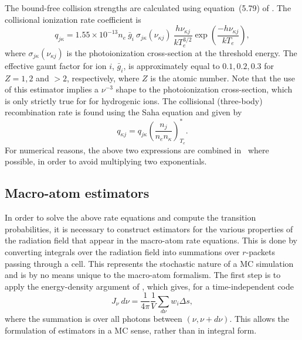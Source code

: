 The bound-free collision strengths are calculated using equation~(5.79) of
\cite{mihalas}. The collisional ionization rate coefficient is
\begin{equation}
q_{j\kappa} = 1.55 \times 10^{-13} n_e~\bar{g}_{i}~\sigma_{j\kappa} (\nu_{\kappa j})~
\frac{h \nu_{\kappa j}}{k T_e^{3/2}}
\exp \left( \frac{- h \nu_{\kappa j}}{k T_e} \right),
\label{eq:qioniz}
\end{equation}
where $\sigma_{j\kappa} (\nu_{\kappa j})$ is the photoionization cross-section 
at the threshold energy.
The effective gaunt factor for ion $i$, $\bar{g}_{i}$, is approximately
equal to $0.1,0.2,0.3$ for $Z=1,2$ and $>2$, respectively,
where $Z$ is the atomic number. Note that the use of this estimator
implies a $\nu^{-3}$ shape to the photoionization cross-section,
which is only strictly true for for hydrogenic ions.
The collisional (three-body) recombination rate is found using the Saha equation
and given by
\begin{equation}
q_{\kappa j} = q_{j\kappa} \left( \frac{n_j}{n_e n_\kappa} \right)^*_{T_e}.
\label{eq:qrecomb}
\end{equation}
For numerical reasons, the above two expressions are combined in \py\ where 
possible, in order to avoid multiplying two exponentials.





\subsection{Macro-atom estimators}
\label{sec:estimators}
In order to solve the above rate equations and compute the transition 
probabilities, it is necessary to construct estimators for the various properties
of the radiation field that appear in the macro-atom rate equations. This is done
by converting integrals over the radiation field into summations over 
$r$-packets passing through a cell. This represents the stochastic nature of
a MC simulation and is by no means unique to the macro-atom formalism.
The first step is to apply the energy-density argument of \cite{lucy1999radeq},
which gives, for a time-independent code
\begin{equation}
J_\nu~d\nu = \frac{1}{4\pi}\frac{1}{V} \sum_{d\nu} w_i \Delta s,
\end{equation}
where the summation is over all photons between $(\nu, \nu+d\nu)$. This allows
the formulation of estimators in a MC sense, rather than in integral form. 

